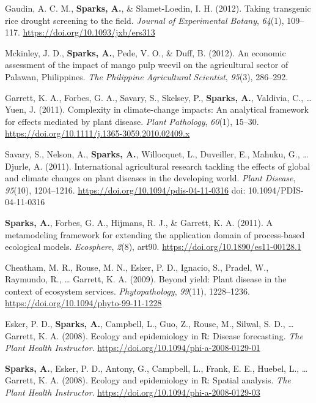 \documentclass[11pt, a4paper]{awesome-cv}
\newcommand{\CSLBlock}[1]{#1\hfill\break}
\begin{document}
\leavevmode\hypertarget{ref-Gaudin2012}{}%
Gaudin, A. C. M., \textbf{Sparks, A.}, \& Slamet-Loedin, I. H. (2012).
Taking transgenic rice drought screening to the field. \emph{Journal of
Experimental Botany}, \emph{64}(1), 109--117.
\url{https://doi.org/10.1093/jxb/ers313}

\leavevmode\hypertarget{ref-Mckinley2012}{}%
Mckinley, J. D., \textbf{Sparks, A.}, Pede, V. O., \& Duff, B. (2012).
An economic assessment of the impact of mango pulp weevil on the
agricultural sector of {Palawan, Philippines}. \emph{The Philippine
Agricultural Scientist}, \emph{95}(3), 286--292.

\leavevmode\hypertarget{ref-Garrett2011}{}%
Garrett, K. A., Forbes, G. A., Savary, S., Skelsey, P.,
\textbf{Sparks, A.}, Valdivia, C., \ldots{} Yuen, J. (2011). Complexity
in climate-change impacts: An analytical framework for effects mediated
by plant disease. \emph{Plant Pathology}, \emph{60}(1), 15--30.
\url{https://doi.org/10.1111/j.1365-3059.2010.02409.x}

\leavevmode\hypertarget{ref-Savary2011}{}%
Savary, S., Nelson, A., \textbf{Sparks, A.}, Willocquet, L., Duveiller,
E., Mahuku, G., \ldots{} Djurle, A. (2011). International agricultural
research tackling the effects of global and climate changes on plant
diseases in the developing world. \emph{Plant Disease}, \emph{95}(10),
1204--1216. \url{https://doi.org/10.1094/pdis-04-11-0316}
\CSLBlock{doi: 10.1094/PDIS-04-11-0316}

\leavevmode\hypertarget{ref-Sparks2011}{}%
\textbf{Sparks, A.}, Forbes, G. A., Hijmans, R. J., \& Garrett, K. A.
(2011). A metamodeling framework for extending the application domain of
process-based ecological models. \emph{Ecosphere}, \emph{2}(8), art90.
\url{https://doi.org/10.1890/es11-00128.1}

\leavevmode\hypertarget{ref-Cheatham2009}{}%
Cheatham, M. R., Rouse, M. N., Esker, P. D., Ignacio, S., Pradel, W.,
Raymundo, R., \ldots{} Garrett, K. A. (2009). Beyond yield: {Plant}
disease in the context of ecosystem services. \emph{Phytopathology},
\emph{99}(11), 1228--1236.
\url{https://doi.org/10.1094/phyto-99-11-1228}

\leavevmode\hypertarget{ref-Esker2008}{}%
Esker, P. D., \textbf{Sparks, A.}, Campbell, L., Guo, Z., Rouse, M.,
Silwal, S. D., \ldots{} Garrett, K. A. (2008). Ecology and epidemiology
in {R}: Disease forecasting. \emph{The Plant Health Instructor}.
\url{https://doi.org/10.1094/phi-a-2008-0129-01}

\leavevmode\hypertarget{ref-Sparks2008a}{}%
\textbf{Sparks, A.}, Esker, P. D., Antony, G., Campbell, L., Frank, E.
E., Huebel, L., \ldots{} Garrett, K. A. (2008). Ecology and epidemiology
in {R}: Spatial analysis. \emph{The Plant Health Instructor}.
\url{https://doi.org/10.1094/phi-a-2008-0129-03}
\end{document}
